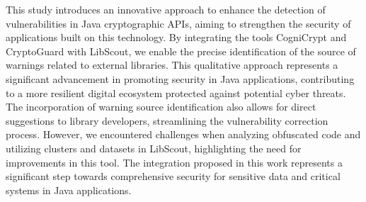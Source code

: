 
This study introduces an innovative approach to enhance the detection of vulnerabilities in Java cryptographic APIs,
aiming to strengthen the security of applications built on this technology. By integrating the tools CogniCrypt 
and CryptoGuard with LibScout, we enable the precise identification of the source of warnings related to external libraries.
This qualitative approach represents a significant advancement in promoting security in Java applications, 
contributing to a more resilient digital ecosystem protected against potential cyber threats. 
The incorporation of warning source identification also allows for direct suggestions to library developers, 
streamlining the vulnerability correction process. However, we encountered challenges when analyzing obfuscated 
code and utilizing clusters and datasets in LibScout, highlighting the need for improvements in this tool. 
The integration proposed in this work represents a significant step towards comprehensive security for sensitive 
data and critical systems in Java applications.